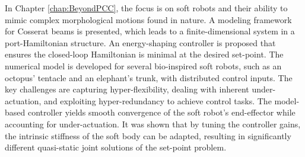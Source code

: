 In Chapter \ref{chap:BeyondPCC}, the focus is on soft robots and their ability to mimic complex morphological motions found in nature. A modeling framework for Cosserat beams is presented, which leads to a finite-dimensional system in a port-Hamiltonian structure. An energy-shaping controller is proposed that ensures the closed-loop Hamiltonian is minimal at the desired set-point. The numerical model is developed for several bio-inspired soft robots, such as an octopus' tentacle and an elephant's trunk, with distributed control inputs. The key challenges are capturing hyper-flexibility, dealing with inherent under-actuation, and exploiting hyper-redundancy to achieve control tasks. The model-based controller yields smooth convergence of the soft robot's end-effector while accounting for under-actuation. It was shown that by tuning the controller gains, the intrinsic stiffness of the soft body can be adapted, resulting in significantly different quasi-static joint solutions of the set-point problem.

